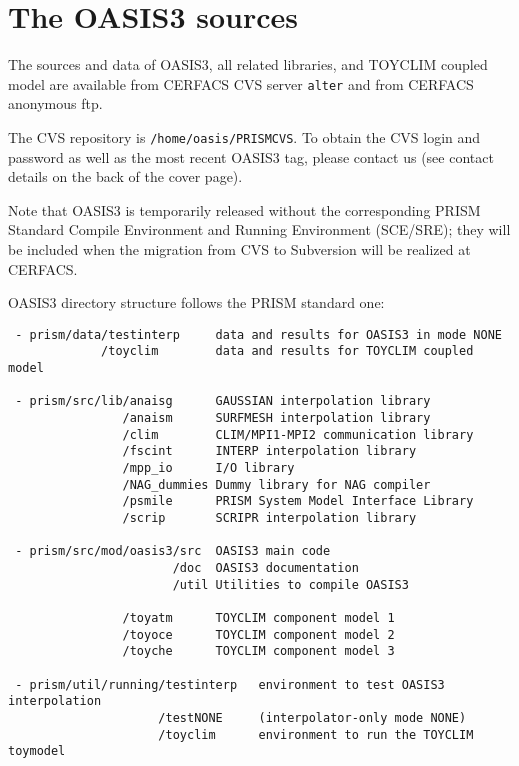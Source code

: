 \newpage
\chapter{The OASIS3 sources}
\label{sec_Obtaining}
%
The sources and data of OASIS3, all related libraries, and TOYCLIM
coupled model are available from CERFACS CVS server \texttt{alter}
and from CERFACS anonymous ftp.

The CVS repository is {\tt /home/oasis/PRISMCVS}.  To obtain the CVS
login and password as well as the most recent OASIS3 tag, please
contact us (see contact details on the back of the cover page).

Note that OASIS3 is temporarily released without the corresponding
PRISM Standard Compile Environment and Running Environment (SCE/SRE);
they will be included when the migration from CVS to Subversion will
be realized at CERFACS.

OASIS3 directory structure follows the PRISM standard one:

\begin{verbatim}
 - prism/data/testinterp     data and results for OASIS3 in mode NONE
             /toyclim        data and results for TOYCLIM coupled model
               
 - prism/src/lib/anaisg      GAUSSIAN interpolation library
                /anaism      SURFMESH interpolation library
                /clim        CLIM/MPI1-MPI2 communication library
                /fscint      INTERP interpolation library  
                /mpp_io      I/O library
                /NAG_dummies Dummy library for NAG compiler
                /psmile      PRISM System Model Interface Library
                /scrip       SCRIPR interpolation library
                  
 - prism/src/mod/oasis3/src  OASIS3 main code
                       /doc  OASIS3 documentation
                       /util Utilities to compile OASIS3

                /toyatm      TOYCLIM component model 1
                /toyoce      TOYCLIM component model 2
                /toyche      TOYCLIM component model 3
                
 - prism/util/running/testinterp   environment to test OASIS3 interpolation
                     /testNONE     (interpolator-only mode NONE)
                     /toyclim      environment to run the TOYCLIM toymodel
 
\end{verbatim}
%                              
% 
%
